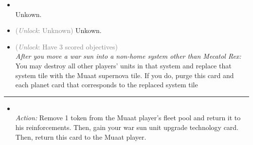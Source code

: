 \begin{multicols}{2}
\begin{itemize}
\item {}\\
Unkown.
\item {} \textcolor{gray}{(\emph{Unlock}: Unknown)}
Unkown.
\item {} \textcolor{gray}{(\emph{Unlock}: Have 3 scored objectives)}\\
\emph{After you move a war sun into a non-home system other than Mecatol Rex:}\\
You may destroy all other players' units in that system and replace that system tile with the Muaat supernova tile. If you do, purge this card and each planet card that corresponds to the replaced system tile
\end{itemize}

\vspace{-10pt}\rule{\hsize}{0.4pt}\vspace{5pt}


\begin{itemize}
\item {}\\
\emph{Action:}
Remove 1 token from the Muaat player's fleet pool and return it to his reinforcements. Then, gain your war sun unit upgrade technology card.\\
Then, return this card to the Muaat player.
\end{itemize}

\end{multicols}



